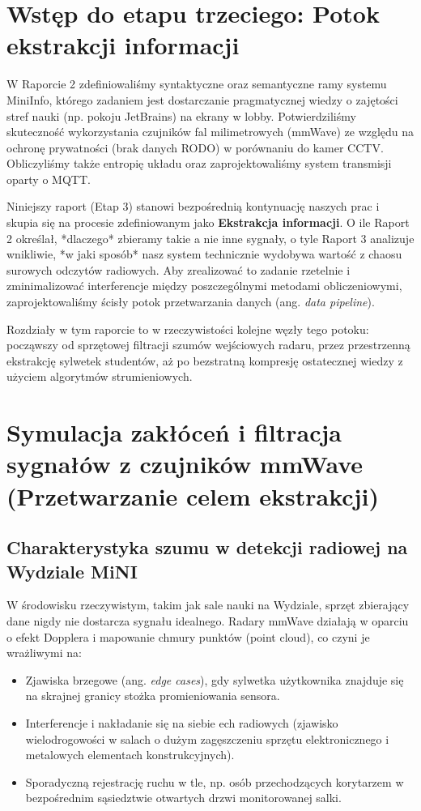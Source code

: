 \documentclass[14pt,a4paper]{extarticle}
\begin{document}
\section{Wstęp do etapu trzeciego: Potok ekstrakcji informacji}

W Raporcie 2 zdefiniowaliśmy syntaktyczne oraz semantyczne ramy systemu MiniInfo, którego zadaniem jest dostarczanie pragmatycznej wiedzy o zajętości stref nauki (np. pokoju JetBrains) na ekrany w lobby. Potwierdziliśmy skuteczność wykorzystania czujników fal milimetrowych (mmWave) ze względu na ochronę prywatności (brak danych RODO) w porównaniu do kamer CCTV. Obliczyliśmy także entropię układu oraz zaprojektowaliśmy system transmisji oparty o MQTT.

Niniejszy raport (Etap 3) stanowi bezpośrednią kontynuację naszych prac i skupia się na procesie zdefiniowanym jako \textbf{Ekstrakcja informacji}. O ile Raport 2 określał, *dlaczego* zbieramy takie a nie inne sygnały, o tyle Raport 3 analizuje wnikliwie, *w jaki sposób* nasz system technicznie wydobywa wartość z chaosu surowych odczytów radiowych. Aby zrealizować to zadanie rzetelnie i zminimalizować interferencje między poszczególnymi metodami obliczeniowymi, zaprojektowaliśmy ścisły potok przetwarzania danych (ang. \textit{data pipeline}). 

Rozdziały w tym raporcie to w rzeczywistości kolejne węzły tego potoku: począwszy od sprzętowej filtracji szumów wejściowych radaru, przez przestrzenną ekstrakcję sylwetek studentów, aż po bezstratną kompresję ostatecznej wiedzy z użyciem algorytmów strumieniowych.

\section{Symulacja zakłóceń i filtracja sygnałów z czujników mmWave (Przetwarzanie celem ekstrakcji)}

\subsection{Charakterystyka szumu w detekcji radiowej na Wydziale MiNI}
W środowisku rzeczywistym, takim jak sale nauki na Wydziale, sprzęt zbierający dane nigdy nie dostarcza sygnału idealnego. Radary mmWave działają w oparciu o efekt Dopplera i mapowanie chmury punktów (point cloud), co czyni je wrażliwymi na:
\begin{itemize}
    \item Zjawiska brzegowe (ang. \textit{edge cases}), gdy sylwetka użytkownika znajduje się na skrajnej granicy stożka promieniowania sensora.
    \item Interferencje i nakładanie się na siebie ech radiowych (zjawisko wielodrogowości w salach o dużym zagęszczeniu sprzętu elektronicznego i metalowych elementach konstrukcyjnych).
    \item Sporadyczną rejestrację ruchu w tle, np. osób przechodzących korytarzem w bezpośrednim sąsiedztwie otwartych drzwi monitorowanej salki.
\end{itemize}
\end{document}
